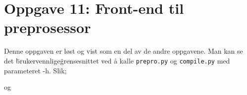 \section*{Oppgave 11: Front-end til preprosessor}

Denne oppgaven er løst og vist som en del av de andre oppgavene. Man kan se det \"brukervennlige\" grensesnittet ved å kalle \verb;prepro.py; og \verb;compile.py; med parameteret -h. Slik;


og



